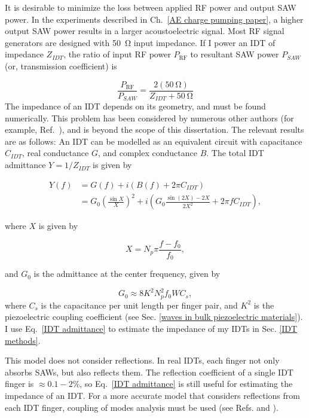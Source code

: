 \documentclass[double,12pt,1in,seploa]{beavtex}
\begin{document}
It is desirable to minimize the loss between applied RF power and output SAW power. In the experiments described in Ch.\ \ref{AE charge pumping paper}, a higher output SAW power results in a larger acoustoelectric signal. Most RF signal generators are designed with \SI{50}{\ohm} input impedance. If I power an IDT of impedance $Z_{IDT}$, the ratio of input RF power $P_{\mathrm{RF}}$ to resultant SAW power $P_{SAW}$ (or, transmission coefficient) is

\begin{equation}
    \frac{P_{\mathrm{RF}}}{P_{SAW}} = \frac{2 (\SI{50}{\ohm})}{Z_{IDT} + \SI{50}{\ohm}} \label{transmission coefficient}
\end{equation}
The impedance of an IDT depends on its geometry, and must be found numerically. This problem has been considered by numerous other authors (for example, Ref.\ \cite{smith_analysis_1969}), and is beyond the scope of this dissertation. The relevant results are as follows: An IDT can be modelled as an equivalent circuit with capacitance $C_{IDT}$, real conductance $G$, and complex conductance $B$. The total IDT admittance $Y = 1/Z_{IDT}$ is given by 


\begin{align}
    Y(f) &= G(f) + i(B(f) + 2\pi C_{IDT})\\
    &= G_0 \left(\frac{\sin X}{X}\right)^2 + i \left(G_0 \frac{\sin (2X) - 2X}{2X^2} + 2\pi f C_{IDT}\right), \label{IDT admittance}
\end{align}

where $X$ is given by

\begin{equation}
    X = N_p \pi \frac{f - f_0}{f_0},
\end{equation}

and $G_0$ is the admittance at the center frequency, given by 

\begin{equation}
    G_0 \approx 8 K^2 N_p^2 f_0 W C_s,
\end{equation}
where $C_s$ is the capacitance per unit length per finger pair, and $K^2$ is the piezoelectric coupling coefficient (see Sec. \ref{waves in bulk piezoelectric materials}). I use Eq.\ \ref{IDT admittance} to estimate the impedance of my IDTs in Sec. \ref{IDT methods}.

This model does not consider reflections. In real IDTs, each finger not only absorbs SAWs, but also reflects them. The reflection coefficient of a single IDT finger is $\approx 0.1-2\%$, so Eq.\ \ref{IDT admittance} is still useful for estimating the impedance of an IDT. For a more accurate model that considers reflections from each IDT finger, coupling of modes analysis must be used (see Refs. \cite[p.\ 140-149]{lane_integrating_2021} and \cite[Ch.\ 4]{campbell_surface_1989}). 
\end{document}
